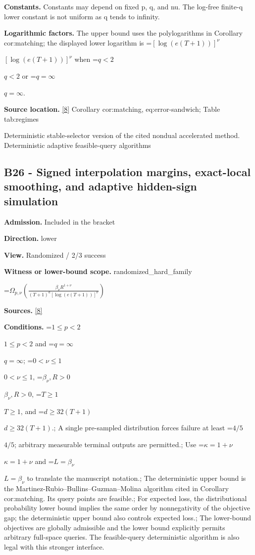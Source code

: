 \documentclass[10pt,a4paper]{article}
\newcommand{\AtlasMath}[1]{\par\begingroup\centering\setbox0=\hbox{$\displaystyle #1$}\ifdim\wd0>1.4\linewidth\typeout{ATLAS WIDE FORMULA: \the\wd0}\fi\ifdim\wd0>\linewidth\resizebox{\linewidth}{!}{\box0}\else\box0\fi\par\endgroup}
\newcommand{\AtlasInlineMath}[1]{\begingroup\setbox0=\hbox{$#1$}\ifdim\wd0>.4\linewidth\endgroup\AtlasMath{#1}\else\endgroup$#1$\fi}
\begin{document}
\textbf{Constants.} Constants may depend on fixed p, q, and nu. The log-free finite-q lower constant is not uniform as q tends to infinity.



\textbf{Logarithmic factors.} The upper bound uses the polylogarithms in Corollary cor:matching; the displayed lower logarithm is \AtlasInlineMath{[\log(e(T+1))]^\nu} when \AtlasInlineMath{q<2} or \AtlasInlineMath{q=\infty}.



\textbf{Source location.} \href{https://github.com/WU-Wendao/Colombo/blob/main/colombo_sensorium/Complexity_altas/data/sources/colombo/B1/manuscript.pdf}{[8]} Corollary cor:matching, eq:error-sandwich; Table tab:regimes



Deterministic stable-selector version of the cited nondual accelerated method. Deterministic adaptive feasible-query algorithms



\subsection{B26 - Signed interpolation margins, exact-local smoothing, and adaptive hidden-sign simulation}


\textbf{Admission.} Included in the bracket



\textbf{Direction.} lower



\textbf{View.} Randomized / 2/3 success



\textbf{Witness or lower-bound scope.} randomized\_hard\_family



\AtlasMath{\Omega_{p,\nu}\!\left(\frac{\beta_\nu R^{1+\nu}}{(T+1)^a[\log(e(T+1))]^\nu}\right)}


\textbf{Sources.} \href{https://github.com/WU-Wendao/Colombo/blob/main/colombo_sensorium/Complexity_altas/data/sources/colombo/B1/manuscript.pdf}{[8]}



\textbf{Conditions.} \AtlasInlineMath{1\le p<2} and \AtlasInlineMath{q=\infty}; \AtlasInlineMath{0<\nu\le1}, \AtlasInlineMath{\beta_\nu,R>0}, \AtlasInlineMath{T\ge1}, and \AtlasInlineMath{d\ge32(T+1)}.; A single pre-sampled distribution forces failure at least \AtlasInlineMath{4/5}; arbitrary measurable terminal outputs are permitted.; Use \AtlasInlineMath{\kappa=1+\nu} and \AtlasInlineMath{L=\beta_\nu} to translate the manuscript notation.; The deterministic upper bound is the Martinez-Rubio--Bullins--Guzman--Molina algorithm cited in Corollary cor:matching. Its query points are feasible.; For expected loss, the distributional probability lower bound implies the same order by nonnegativity of the objective gap; the deterministic upper bound also controls expected loss.; The lower-bound objectives are globally admissible and the lower bound explicitly permits arbitrary full-space queries. The feasible-query deterministic algorithm is also legal with this stronger interface.
\end{document}
